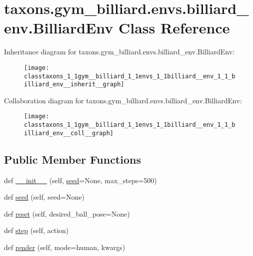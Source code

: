 \hypertarget{classtaxons_1_1gym__billiard_1_1envs_1_1billiard__env_1_1_billiard_env}{}\section{taxons.\+gym\+\_\+billiard.\+envs.\+billiard\+\_\+env.\+Billiard\+Env Class Reference}
\label{classtaxons_1_1gym__billiard_1_1envs_1_1billiard__env_1_1_billiard_env}


Inheritance diagram for taxons.\+gym\+\_\+billiard.\+envs.\+billiard\+\_\+env.\+Billiard\+Env\+:
\nopagebreak
\begin{figure}[H]
\begin{center}
\leavevmode
\texttt{[image: classtaxons\_1\_1gym\_\_billiard\_1\_1envs\_1\_1billiard\_\_env\_1\_1\_billiard\_env\_\_inherit\_\_graph]}
\end{center}
\end{figure}


Collaboration diagram for taxons.\+gym\+\_\+billiard.\+envs.\+billiard\+\_\+env.\+Billiard\+Env\+:
\nopagebreak
\begin{figure}[H]
\begin{center}
\leavevmode
\texttt{[image: classtaxons\_1\_1gym\_\_billiard\_1\_1envs\_1\_1billiard\_\_env\_1\_1\_billiard\_env\_\_coll\_\_graph]}
\end{center}
\end{figure}
\subsection*{Public Member Functions}
\begin{DoxyCompactItemize}
\item 
def \hyperlink{classtaxons_1_1gym__billiard_1_1envs_1_1billiard__env_1_1_billiard_env_ac530fa797628bd8c81d2de7e96cbc9a7}{\+\_\+\+\_\+init\+\_\+\+\_\+} (self, \hyperlink{classtaxons_1_1gym__billiard_1_1envs_1_1billiard__env_1_1_billiard_env_aac2d5d5e4b17abc83ed2534b429db790}{seed}=None, max\+\_\+steps=500)
\item 
def \hyperlink{classtaxons_1_1gym__billiard_1_1envs_1_1billiard__env_1_1_billiard_env_aac2d5d5e4b17abc83ed2534b429db790}{seed} (self, seed=None)
\item 
def \hyperlink{classtaxons_1_1gym__billiard_1_1envs_1_1billiard__env_1_1_billiard_env_a094d8ca1846f8cd02a437772a21f44f8}{reset} (self, desired\+\_\+ball\+\_\+pose=None)
\item 
def \hyperlink{classtaxons_1_1gym__billiard_1_1envs_1_1billiard__env_1_1_billiard_env_a9aec06d9a7910b796d372fb9bd93f9ee}{step} (self, action)
\item 
def \hyperlink{classtaxons_1_1gym__billiard_1_1envs_1_1billiard__env_1_1_billiard_env_a90b8cb7902e807b3fef7272c640d68cc}{render} (self, mode=\textquotesingle{}human\textquotesingle{}, kwargs)
\end{DoxyCompactItemize}
